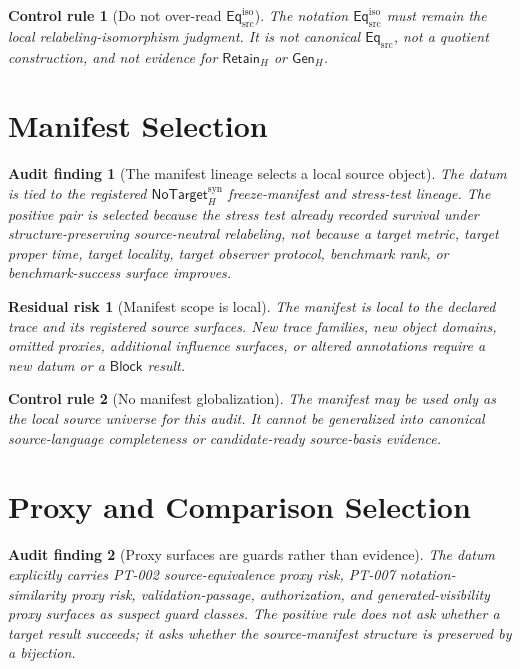 \documentclass[11pt]{article}
\newcommand{\EqSrc}{\mathsf{Eq}_{\mathrm{src}}}
\newcommand{\EqIso}{\mathsf{Eq}_{\mathrm{src}}^{\mathrm{iso}}}
\newcommand{\GenH}{\mathsf{Gen}_{H}}
\newcommand{\RetainH}{\mathsf{Retain}_{H}}
\newcommand{\NoTargetSyn}{\mathsf{NoTarget}_{H}^{\mathrm{syn}}}
\newcommand{\Block}{\mathsf{Block}}
\newtheorem{auditfinding}{Audit finding}
\newtheorem{residualrisk}{Residual risk}
\newtheorem{controlrule}{Control rule}
\begin{document}
\begin{controlrule}[Do not over-read \(\EqIso\)]
The notation \(\EqIso\) must remain the local relabeling-isomorphism
judgment. It is not canonical \(\EqSrc\), not a quotient construction, and
not evidence for \(\RetainH\) or \(\GenH\).
\end{controlrule}

\section{Manifest Selection}

\begin{auditfinding}[The manifest lineage selects a local source object]
The datum is tied to the registered \(\NoTargetSyn\) freeze-manifest and
stress-test lineage. The positive pair is selected because the stress test
already recorded survival under structure-preserving source-neutral
relabeling, not because a target metric, target proper time, target
locality, target observer protocol, benchmark rank, or benchmark-success
surface improves.
\end{auditfinding}

\begin{residualrisk}[Manifest scope is local]
The manifest is local to the declared trace and its registered source
surfaces. New trace families, new object domains, omitted proxies,
additional influence surfaces, or altered annotations require a new datum
or a \(\Block\) result.
\end{residualrisk}

\begin{controlrule}[No manifest globalization]
The manifest may be used only as the local source universe for this audit.
It cannot be generalized into canonical source-language completeness or
candidate-ready source-basis evidence.
\end{controlrule}

\section{Proxy and Comparison Selection}

\begin{auditfinding}[Proxy surfaces are guards rather than evidence]
The datum explicitly carries PT-002 source-equivalence proxy risk, PT-007
notation-similarity proxy risk, validation-passage, authorization, and
generated-visibility proxy surfaces as suspect guard classes. The positive
rule does not ask whether a target result succeeds; it asks whether the
source-manifest structure is preserved by a bijection.
\end{auditfinding}
\end{document}
